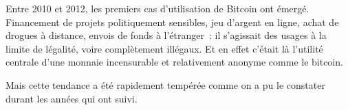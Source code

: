 Entre 2010 et 2012, les premiers cas d'utilisation de Bitcoin ont émergé. Financement de projets politiquement sensibles, jeu d'argent en ligne, achat de drogues à distance, envois de fonds à l'étranger~: il s'agissait des usages à la limite de légalité, voire complètement illégaux. Et en effet c'était là l'utilité centrale d'une monnaie incensurable et relativement anonyme comme le bitcoin.

Mais cette tendance a été rapidement tempérée comme on a pu le constater durant les années qui ont suivi.

\printendnotes
